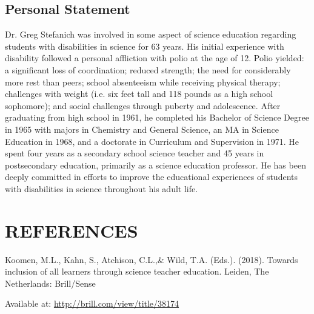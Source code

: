 \documentclass[11.5pt]{sig-alternate} %
\begin{document}
\begin{large}
\subsection*{Personal Statement}

Dr. Greg Stefanich was involved in some aspect of science education regarding students with disabilities in science for 63 years.  His initial experience with disability followed a personal affliction with polio at the age of 12. Polio yielded: a significant loss of coordination; reduced strength; the need for considerably more rest than peers; school absenteeism while receiving physical therapy; challenges with weight (i.e. six feet tall and 118 pounds as a high school sophomore); and social challenges through puberty and adolescence. After graduating from high school in 1961, he completed his Bachelor of Science Degree in 1965 with majors in Chemistry and General Science, an MA in Science Education in 1968, and a doctorate in Curriculum and Supervision in 1971.  He spent four years as a secondary school science teacher and 45 years in postsecondary education, primarily as a science education professor.  He has been deeply committed in efforts to improve the educational experiences of students with disabilities in science throughout his adult life.

\end{large}
\clearpage
\section*{REFERENCES}\par 

\leftskip 0.25in
\parindent -0.25in 
Koomen, M.L., Kahn, S., Atchison, C.L.,\& Wild, T.A. (Eds.). (2018). Towards inclusion of all learners through science teacher education. Leiden, The Netherlands: Brill/Sense

Available at:
\url{http://brill.com/view/title/38174}
\end{document}
